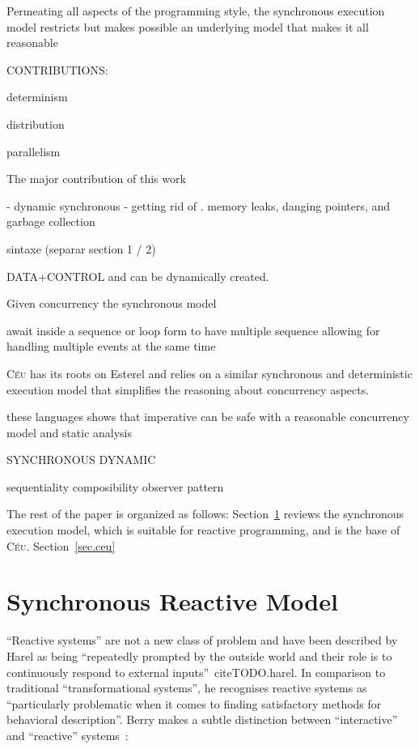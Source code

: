 \documentclass{acm_proc_article-sp}
\newcommand{\CEU}{\textsc{C\'{e}u}\xspace}
\newcommand{\1}{\;}
\newcommand{\2}{\;\;}
\newcommand{\3}{\;\;\;}
\newcommand{\5}{\;\;\;\;\;}
\begin{document}
Permeating all aspects of the programming style, the synchronous execution 
model
restricts
but makes possible
an underlying model that makes it all reasonable

CONTRIBUTIONS:

determinism

distribution

parallelism

The major contribution of this work

- dynamic synchronous
- getting rid of .
memory leaks, danging pointers, and garbage collection

sintaxe (separar section 1 / 2)

DATA+CONTROL and can be dynamically created.

Given concurrency
the synchronous model

await inside a sequence or loop
form to have multiple sequence allowing for handling multiple events at the 
same time

%
\CEU has its roots on Esterel and relies on a similar synchronous and 
deterministic execution model that simplifies the reasoning about concurrency 
aspects.

these languages shows that imperative can be safe with a reasonable concurrency 
model and static analysis

SYNCHRONOUS
DYNAMIC

sequentiality
composibility
observer pattern

The rest of the paper is organized as follows:
Section~\ref{sec.overview} reviews the synchronous execution model, which is 
suitable for reactive programming, and is the base of \CEU.
Section~\ref{sec.ceu}

\section{Synchronous Reactive Model}
\label{sec.overview}

``Reactive systems'' are not a new class of problem and have been described by 
Harel as being ``repeatedly prompted by the outside world and their role is to 
continuously respond to external inputs''~cite{TODO.harel}.
In comparison to traditional ``transformational systems'', he recognises 
reactive systems as ``particularly problematic when it comes to finding 
satisfactory methods for behavioral description''.
%
Berry makes a subtle distinction between ``interactive'' and ``reactive'' 
systems~\cite{TODO:RR-1445}:
\end{document}
